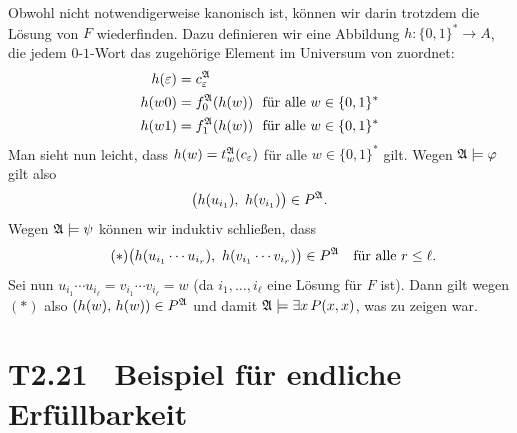 \documentclass[fontsize=11pt, twoside=false, numbers=autoenddot]{scrbook}
\begin{document}
\begin{beweis}
\begin{description}
      Obwohl \Amf nicht notwendigerweise kanonisch ist,
      können wir darin trotzdem die Lösung von $F$ wiederfinden.
      Dazu definieren wir eine Abbildung $h : \{0,1\}^* \to A$, die jedem $0$-$1$-Wort das zugehörige Element im Universum von \Amf zuordnet:
      \begin{align*}
        h(\varepsilon) & = c_\varepsilon^\mathfrak{A}                                \\
        h(w0)          & = f_0^\mathfrak{A}(h(w)) ~~\text{für alle}~ w \in \{0,1\}^* \\
        h(w1)          & = f_1^\mathfrak{A}(h(w)) ~~\text{für alle}~ w \in \{0,1\}^*
      \end{align*}
      Man sieht nun leicht, dass $h(w) = t_w^\mathfrak{A}(c_\varepsilon)$ für alle $w \in \{0,1\}^*$ gilt.
      Wegen $\mathfrak{A} \models \varphi$ gilt also
      \[
        \big(h(u_{i_1}),~h(v_{i_1})\big) \in P^\mathfrak{A}.
      \]
      Wegen $\mathfrak{A} \models \psi$ können wir induktiv schließen, dass
      \[
        \tag{$*$}
        \big(h(u_{i_1} \cdots u_{i_r}),~h(v_{i_1} \cdots v_{i_r})\big) \in P^\mathfrak{A} \quad\text{für alle~} r \leq \ell.
      \]
      Sei nun $u_{i_1} \cdots u_{i_\ell} = v_{i_1} \cdots v_{i_\ell} = w$ (da $i_1,\dots,i_\ell$ eine Lösung für $F$ ist).
      Dann gilt wegen $(*)$ also $(h(w),\,h(w)) \in P^\mathfrak{A}$ und damit $\mathfrak{A} \models \exists x\, P(x,x)$, was zu zeigen war.
      \qedhere
  \end{description}
\end{beweis}%

\section*{T2.21~ Beispiel für endliche Erfüllbarkeit}
\end{document}
